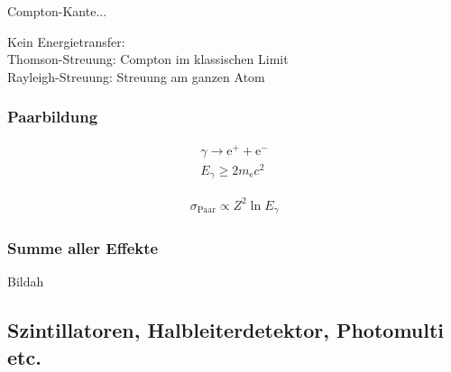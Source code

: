 \documentclass[11pt, a4paper]{article}
\numberwithin{equation}{section}
\begin{document}
Compton-Kante...

Kein Energietransfer:\\
Thomson-Streuung: Compton im klassischen Limit\\
Rayleigh-Streuung: Streuung am ganzen Atom\\


\subsubsection{Paarbildung}
\begin{align}
	\gamma \rightarrow \mathrm{e}^{+} + \mathrm{e}^{-}\\
	E_\gamma \geq 2 m_\mathrm{e} c^2
\end{align}

\begin{align}
	\sigma_\mathrm{Paar} \propto Z^2 \ln E_\gamma
\end{align}

\subsubsection{Summe aller Effekte}

Bildah

\subsection{Szintillatoren, Halbleiterdetektor, Photomulti etc.}
\end{document}

